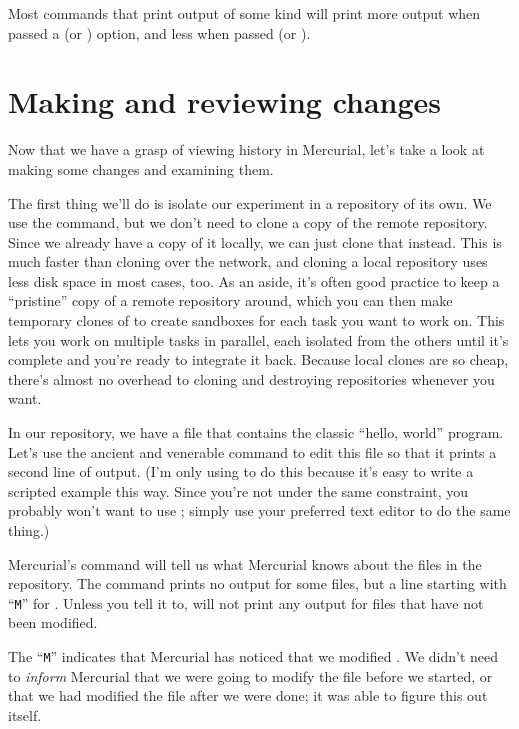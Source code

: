 Most commands that print output of some kind will print more output
when passed a  (or ) option, and less
when passed  (or ).

\section{Making and reviewing changes}

Now that we have a grasp of viewing history in Mercurial, let's take a
look at making some changes and examining them.

The first thing we'll do is isolate our experiment in a repository of
its own.  We use the  command, but we don't need to
clone a copy of the remote repository.  Since we already have a copy
of it locally, we can just clone that instead.  This is much faster
than cloning over the network, and cloning a local repository uses
less disk space in most cases, too.
As an aside, it's often good practice to keep a ``pristine'' copy of a
remote repository around, which you can then make temporary clones of
to create sandboxes for each task you want to work on.  This lets you
work on multiple tasks in parallel, each isolated from the others
until it's complete and you're ready to integrate it back.  Because
local clones are so cheap, there's almost no overhead to cloning and
destroying repositories whenever you want.

In our  repository, we have a file
 that contains the classic ``hello, world'' program.
Let's use the ancient and venerable  command to edit this
file so that it prints a second line of output.  (I'm only using
 to do this because it's easy to write a scripted example
this way.  Since you're not under the same constraint, you probably
won't want to use ; simply use your preferred text editor to
do the same thing.)

Mercurial's  command will tell us what Mercurial knows
about the files in the repository.
The  command prints no output for some files, but a line
starting with ``\texttt{M}'' for .  Unless you tell
it to,  will not print any output for files that have
not been modified.  

The ``\texttt{M}'' indicates that Mercurial has noticed that we
modified .  We didn't need to \emph{inform}
Mercurial that we were going to modify the file before we started, or
that we had modified the file after we were done; it was able to
figure this out itself.

